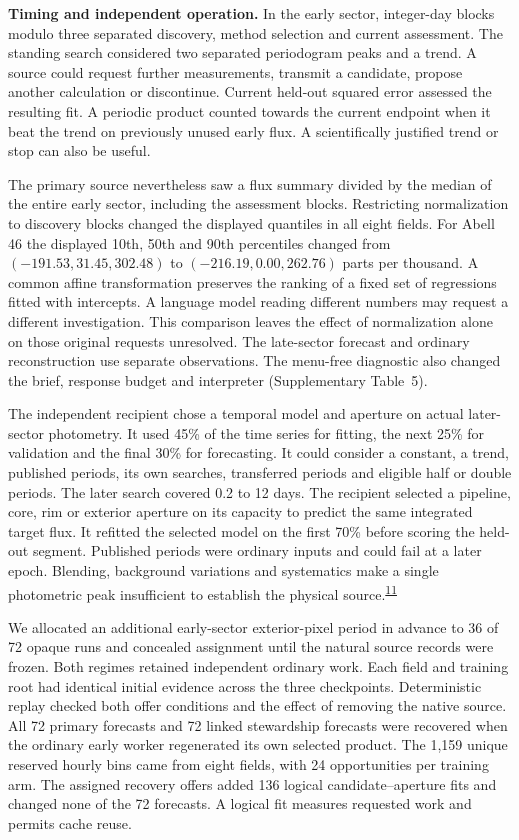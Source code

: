 \documentclass[11pt,a4paper]{article}
\newcommand{\lead}[1]{\textbf{#1}\enspace}
\newcommand{\articlecite}[2]{\textsuperscript{\href{#2}{#1}}}
\begin{document}
\lead{Timing and independent operation.} In the early sector, integer-day blocks modulo three separated discovery, method selection and current assessment. The standing search considered two separated periodogram peaks and a trend. A source could request further measurements, transmit a candidate, propose another calculation or discontinue. Current held-out squared error assessed the resulting fit. A periodic product counted towards the current endpoint when it beat the trend on previously unused early flux. A scientifically justified trend or stop can also be useful.

The primary source nevertheless saw a flux summary divided by the median of the entire early sector, including the assessment blocks. Restricting normalization to discovery blocks changed the displayed quantiles in all eight fields. For Abell 46 the displayed 10th, 50th and 90th percentiles changed from $(-191.53,31.45,302.48)$ to $(-216.19,0.00,262.76)$ parts per thousand. A common affine transformation preserves the ranking of a fixed set of regressions fitted with intercepts. A language model reading different numbers may request a different investigation. This comparison leaves the effect of normalization alone on those original requests unresolved. The late-sector forecast and ordinary reconstruction use separate observations. The menu-free diagnostic also changed the brief, response budget and interpreter (Supplementary Table~5).

The independent recipient chose a temporal model and aperture on actual later-sector photometry. It used 45\% of the time series for fitting, the next 25\% for validation and the final 30\% for forecasting. It could consider a constant, a trend, published periods, its own searches, transferred periods and eligible half or double periods. The later search covered 0.2 to 12 days. The recipient selected a pipeline, core, rim or exterior aperture on its capacity to predict the same integrated target flux. It refitted the selected model on the first 70\% before scoring the held-out segment. Published periods were ordinary inputs and could fail at a later epoch. Blending, background variations and systematics make a single photometric peak insufficient to establish the physical source.\articlecite{11}{https://doi.org/10.3847/1538-3881/acb20c}

We allocated an additional early-sector exterior-pixel period in advance to 36 of 72 opaque runs and concealed assignment until the natural source records were frozen. Both regimes retained independent ordinary work. Each field and training root had identical initial evidence across the three checkpoints. Deterministic replay checked both offer conditions and the effect of removing the native source. All 72 primary forecasts and 72 linked stewardship forecasts were recovered when the ordinary early worker regenerated its own selected product. The 1,159 unique reserved hourly bins came from eight fields, with 24 opportunities per training arm. The assigned recovery offers added 136 logical candidate--aperture fits and changed none of the 72 forecasts. A logical fit measures requested work and permits cache reuse.
\end{document}

